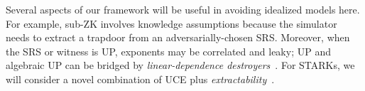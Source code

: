 {\begin{itemize}
Several aspects of our framework will be useful in avoiding idealized models here. For example, sub-ZK  involves knowledge assumptions because the simulator needs to extract a trapdoor from an adversarially-chosen SRS. Moreover, when the SRS or witness is UP, exponents may be correlated and leaky; UP and algebraic UP can be bridged by \emph{linear-dependence destroyers}~\cite{TCC:BFHO22}.  For STARKs, we will consider a novel combination of UCE plus \emph{extractability}~\cite{TCC:CanDak09}.
\fi

\end{itemize}}
